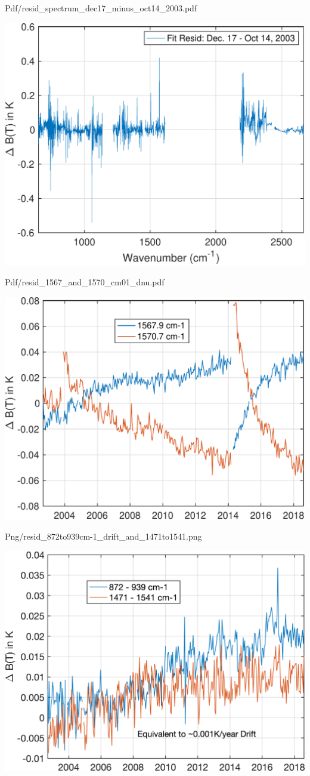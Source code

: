 \documentclass[presentation]{beamer}
\begin{document}
\begin{frame}[label={sec:orgfb8dfe5}]{Pdf/resid\_spectrum\_dec17\_minus\_oct14\_2003.pdf}
\begin{center}
\includegraphics[width=0.7\linewidth]{./Figs/Pdf/resid_spectrum_dec17_minus_oct14_2003.pdf}
\end{center}
\end{frame}

\begin{frame}[label={sec:org9523f14}]{Pdf/resid\_1567\_and\_1570\_cm01\_dnu.pdf}
\begin{center}
\includegraphics[width=0.7\linewidth]{./Figs/Pdf/resid_1567_and_1570_cm01_dnu.pdf}
\end{center}
\end{frame}

\begin{frame}[label={sec:orgadbdc72}]{Png/resid\_872to939cm-1\_drift\_and\_1471to1541.png}
\begin{center}
\includegraphics[width=0.7\linewidth]{./Figs/Png/resid_872to939cm-1_drift_and_1471to1541.png}
\end{center}
\end{frame}
\end{document}
